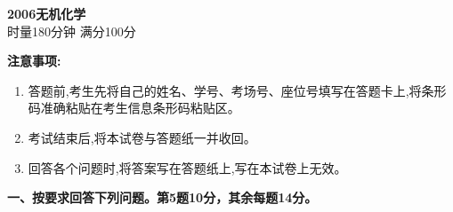 \begin{center}
    {\LARGE \textbf{2006无机化学}} \\[2ex]
    {\large 时量180分钟 \quad 满分100分}
\end{center}

\vspace{0.5cm}
\noindent\textbf{注意事项:}
\begin{enumerate}[label=\arabic*., parsep=0pt, itemsep=0pt]
    \item 答题前,考生先将自己的姓名、学号、考场号、座位号填写在答题卡上,将条形码准确粘贴在考生信息条形码粘贴区。
    \item 考试结束后,将本试卷与答题纸一并收回。
    \item 回答各个问题时,将答案写在答题纸上,写在本试卷上无效。
\end{enumerate}

\vspace{0.5cm}
\noindent\textbf{一、按要求回答下列问题。第5题10分，其余每题14分。}

